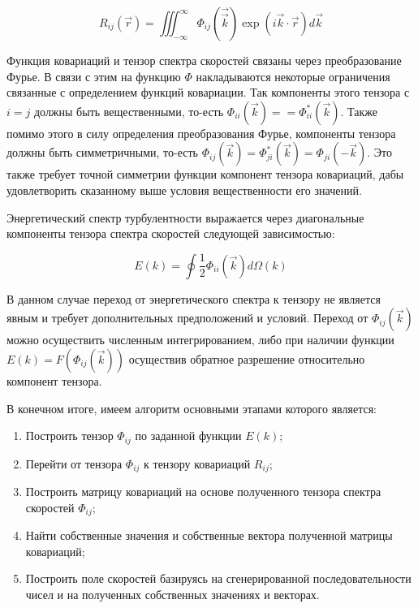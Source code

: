 \begin{equation}
    \label{eq:kriging_equation14_2}
    R_{ij}(\vec{r}) = \iiint_{-\infty}^{\infty}  \Phi_{ij}(\vec{\vec k}) \exp{(i \vec k \cdot \vec r)} d \vec k
\end{equation}

Функция ковариаций и тензор спектра скоростей связаны через преобразование Фурье. В связи с этим на функцию $\Phi$ накладываются некоторые ограничения связанные с определением функций ковариации. Так компоненты этого тензора с $i=j$ должны быть вещественными, то-есть $\Phi_{ii}(\vec k) == \Phi_{ii}^{*}(\vec k)$. Также помимо этого в силу определения преобразования Фурье, компоненты тензора должны быть симметричными, то-есть $\Phi_{ij}(\vec k)=\Phi_{ji}^{*}(\vec k)=\Phi_{ji}(-\vec k)$. Это также требует точной симметрии функции компонент тензора ковариаций, дабы удовлетворить сказанному выше условия вещественности его значений. 

Энергетический спектр турбулентности выражается через диагональные компоненты тензора спектра скоростей следующей зависимостью:

\begin{equation}
    \label{eq:kriging_equation15}
    E(k) = \oint \frac{1}{2} \Phi_{ii}(\vec k) d \Omega (k)    
\end{equation}

В данном случае переход от энергетического спектра к тензору не является явным и требует дополнительных предположений и условий. Переход от $\Phi_{ij}(\vec k)$ можно осуществить численным интегрированием, либо при наличии функции $E(k)=F(\Phi_{ij}(\vec k))$ осуществив обратное разрешение относительно компонент тензора.

В конечном итоге, имеем алгоритм основными этапами которого является:

\begin{enumerate}
    \item Построить тензор $\Phi_{ij}$ по заданной функции $E(k)$;
    \item Перейти от тензора $\Phi_{ij}$ к тензору ковариаций $R_{ij}$;
    \item Построить матрицу ковариаций на основе полученного тензора спектра скоростей $\Phi_{ij}$;
    \item Найти собственные значения и собственные вектора полученной матрицы ковариаций;
    \item Построить поле скоростей базируясь на сгенерированной последовательности чисел и на полученных собственных значениях и векторах.
\end{enumerate}

